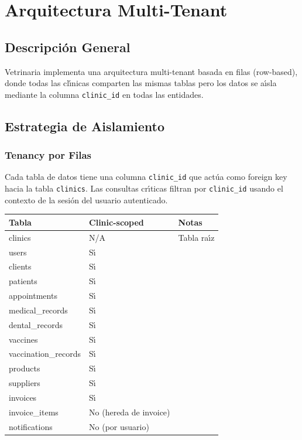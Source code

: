 \chapter{Arquitectura Multi-Tenant}

\section{Descripci\'on General}

Vetrinaria implementa una arquitectura multi-tenant basada en filas
(row-based), donde todas las cl\'{\i}nicas comparten las mismas tablas
pero los datos se a\'{\i}sla mediante la columna \texttt{clinic\_id}
en todas las entidades.

\section{Estrategia de Aislamiento}

\subsection{Tenancy por Filas}

Cada tabla de datos tiene una columna \texttt{clinic\_id} que act\'ua
como foreign key hacia la tabla \texttt{clinics}. Las consultas
cr\'{\i}ticas filtran por \texttt{clinic\_id} usando el contexto de la
sesi\'on del usuario autenticado.

\begin{longtable}{|l|l|l|}
\hline
\textbf{Tabla} & \textbf{Clinic-scoped} & \textbf{Notas} \\
\hline
clinics & N/A & Tabla ra\'{\i}z \\
users & S\'{\i} & \\
clients & S\'{\i} & \\
patients & S\'{\i} & \\
appointments & S\'{\i} & \\
medical\_records & S\'{\i} & \\
dental\_records & S\'{\i} & \\
vaccines & S\'{\i} & \\
vaccination\_records & S\'{\i} & \\
products & S\'{\i} & \\
suppliers & S\'{\i} & \\
invoices & S\'{\i} & \\
invoice\_items & No (hereda de invoice) & \\
notifications & No (por usuario) & \\
\hline
\end{longtable}

